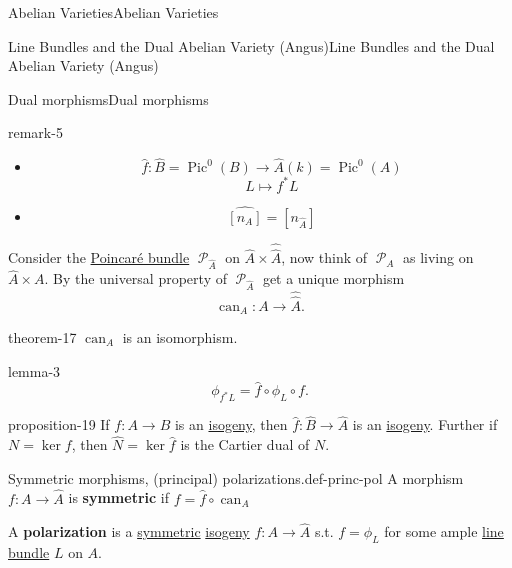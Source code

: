 \documentclass[10pt,]{book}
\newcommand{\terminology}[1]{\textbf{#1}}
\numberwithin{equation}{section}
\newcommand{\sheaf}[1]{\operatorname{\mathcal{#1}}}
\newcommand{\lb}{[}
\newcommand{\rb}{]}
\DeclareMathOperator{\Pic}{Pic}
\begin{document}
\begin{chapterptx}{Abelian Varieties}{}{Abelian Varieties}{}{}
\begin{sectionptx}{Line Bundles and the Dual Abelian Variety (Angus)}{}{Line Bundles and the Dual Abelian Variety (Angus)}{}{}
\begin{subsectionptx}{Dual morphisms}{}{Dual morphisms}{}{}
\begin{remark}{}{remark-5}%
\hypertarget{p-197}{}%
\leavevmode%
\begin{itemize}[label=\textbullet]
\item{}%
\begin{equation*}
\hat f\colon \hat B = \Pic^0(B) \to \hat A(k) = \Pic^0(A)
\end{equation*}
%
\begin{equation*}
L\mapsto f^*L
\end{equation*}
%
\item{}%
\begin{equation*}
\hat{\lb n_A\rb} = [n_{\hat A}]
\end{equation*}
%
\end{itemize}
%
\end{remark}
\hypertarget{p-198}{}%
Consider the \hyperref[thm-poincare-bundle]{Poincaré bundle} \(\sheaf P_{\hat A}\) on \(\hat A \times \hat{\hat{A}}\), now think of \(\sheaf P_A\) as living on \(\hat A \times A\). By the universal property of \(\sheaf P_{\hat A}\) get a unique morphism%
\begin{equation*}
\operatorname{can}_A\colon A\to\hat{\hat A}\text{.}
\end{equation*}
%
\begin{theorem}{}{}{theorem-17}%
\hypertarget{p-199}{}%
\(\operatorname{can}_A\) is an isomorphism.%
\end{theorem}
\begin{lemma}{}{}{lemma-3}%
\hypertarget{p-200}{}%
%
\begin{equation*}
\phi_{f^*L} = \hat f\circ \phi_L\circ f\text{.}
\end{equation*}
%
\end{lemma}
\begin{proposition}{}{}{proposition-19}%
\hypertarget{p-201}{}%
If \(f\colon A \to B\) is an \hyperref[def-supersing-isog-isog]{isogeny}, then \(\hat f\colon \hat B \to \hat A\) is an \hyperref[def-supersing-isog-isog]{isogeny}. Further if \(N  = \ker f\), then \(\hat N = \ker \hat f\) is the Cartier  dual of \(N\).%
\end{proposition}
\begin{definition}{Symmetric morphisms, (principal) polarizations.}{def-princ-pol}%
\hypertarget{p-202}{}%
A morphism \(f\colon A \to \hat A\) is \terminology{symmetric} if \(f = \hat f\circ \operatorname{can}_A\)%
\par
\hypertarget{p-203}{}%
A \terminology{polarization} is a \hyperref[def-princ-pol]{symmetric} \hyperref[def-supersing-isog-isog]{isogeny} \(f\colon A \to \hat A\) s.t. \(f=  \phi_L\) for some ample \hyperref[def-line-bundle]{line bundle} \(L\) on \(A\).%

\end{definition}
\end{subsectionptx}
\end{sectionptx}
\end{chapterptx}
\end{document}
